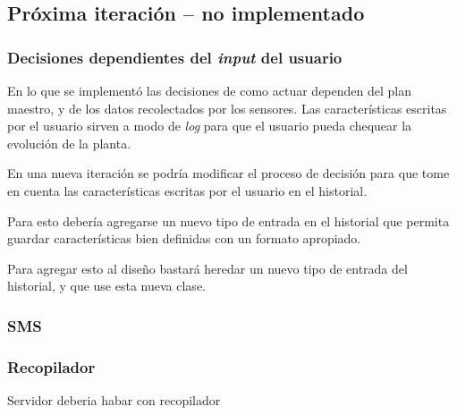     \subsection{Pr\'oxima iteraci\'on -- no implementado}
      \subsubsection{Decisiones dependientes del \textit{input} del usuario}
        En lo que se implement\'o las decisiones de como actuar dependen del plan
        maestro, y de los datos recolectados por los sensores.
        Las caracter\'isticas escritas por el usuario sirven a modo de \textit{log}
        para que el usuario pueda chequear la evoluci\'on de la planta.

        En una nueva iteraci\'on se podr\'ia modificar el proceso de decisi\'on para
        que tome en cuenta las caracter\'isticas escritas por el usuario en el
        historial.

        Para esto deber\'ia agregarse un nuevo tipo de entrada en el historial
        que permita guardar caracter\'isticas bien definidas con un formato apropiado.

        Para agregar esto al dise\~no bastar\'a heredar un nuevo tipo de entrada
        del historial, y que \decisiones{} use esta nueva clase.

      \subsubsection{SMS}

      \subsubsection{Recopilador}
        Servidor deberia habar con recopilador

